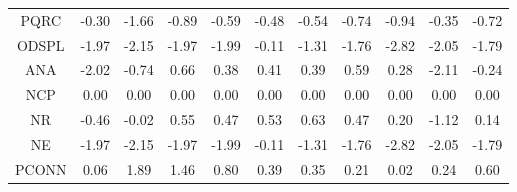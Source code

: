 \documentclass[11pt,a4paper]{report}
\begin{document}
\begin{longtable}{ | c || c | c | c | c | c | c | c | c | c || c |}
PQRC &  \cellcolor[HTML]{FFF7F7} -0.30 &  \cellcolor[HTML]{FFD7D7} -1.66 &  \cellcolor[HTML]{FFE7E7} -0.89 &  \cellcolor[HTML]{FFEFEF} -0.59 &  \cellcolor[HTML]{FFEFEF} -0.48 &  \cellcolor[HTML]{FFEFEF} -0.54 &  \cellcolor[HTML]{FFEFEF} -0.74 &  \cellcolor[HTML]{FFE7E7} -0.94 &  \cellcolor[HTML]{FFF7F7} -0.35 &  \cellcolor[HTML]{FFEFEF} -0.72 \\
ODSPL &  \cellcolor[HTML]{FFCFCF} -1.97 &  \cellcolor[HTML]{FFC7C7} -2.15 &  \cellcolor[HTML]{FFCFCF} -1.97 &  \cellcolor[HTML]{FFCFCF} -1.99 &  \cellcolor[HTML]{FFFFFF} -0.11 &  \cellcolor[HTML]{FFDFDF} -1.31 &  \cellcolor[HTML]{FFCFCF} -1.76 &  \cellcolor[HTML]{FFB7B7} -2.82 &  \cellcolor[HTML]{FFCFCF} -2.05 &  \cellcolor[HTML]{FFCFCF} -1.79 \\
ANA &  \cellcolor[HTML]{FFCFCF} -2.02 &  \cellcolor[HTML]{FFEFEF} -0.74 &  \cellcolor[HTML]{EFEFFF} 0.66 &  \cellcolor[HTML]{F7F7FF} 0.38 &  \cellcolor[HTML]{F7F7FF} 0.41 &  \cellcolor[HTML]{F7F7FF} 0.39 &  \cellcolor[HTML]{EFEFFF} 0.59 &  \cellcolor[HTML]{F7F7FF} 0.28 &  \cellcolor[HTML]{FFC7C7} -2.11 &  \cellcolor[HTML]{FFF7F7} -0.24 \\
NCP &  \cellcolor[HTML]{FFFFFF} 0.00 &  \cellcolor[HTML]{FFFFFF} 0.00 &  \cellcolor[HTML]{FFFFFF} 0.00 &  \cellcolor[HTML]{FFFFFF} 0.00 &  \cellcolor[HTML]{FFFFFF} 0.00 &  \cellcolor[HTML]{FFFFFF} 0.00 &  \cellcolor[HTML]{FFFFFF} 0.00 &  \cellcolor[HTML]{FFFFFF} 0.00 &  \cellcolor[HTML]{FFFFFF} 0.00 &  \cellcolor[HTML]{FFFFFF} 0.00 \\
NR &  \cellcolor[HTML]{FFF7F7} -0.46 &  \cellcolor[HTML]{FFFFFF} -0.02 &  \cellcolor[HTML]{EFEFFF} 0.55 &  \cellcolor[HTML]{F7F7FF} 0.47 &  \cellcolor[HTML]{EFEFFF} 0.53 &  \cellcolor[HTML]{EFEFFF} 0.63 &  \cellcolor[HTML]{F7F7FF} 0.47 &  \cellcolor[HTML]{F7F7FF} 0.20 &  \cellcolor[HTML]{FFDFDF} -1.12 &  \cellcolor[HTML]{FFFFFF} 0.14 \\
NE &  \cellcolor[HTML]{FFCFCF} -1.97 &  \cellcolor[HTML]{FFC7C7} -2.15 &  \cellcolor[HTML]{FFCFCF} -1.97 &  \cellcolor[HTML]{FFCFCF} -1.99 &  \cellcolor[HTML]{FFFFFF} -0.11 &  \cellcolor[HTML]{FFDFDF} -1.31 &  \cellcolor[HTML]{FFCFCF} -1.76 &  \cellcolor[HTML]{FFB7B7} -2.82 &  \cellcolor[HTML]{FFCFCF} -2.05 &  \cellcolor[HTML]{FFCFCF} -1.79 \\
PCONN &  \cellcolor[HTML]{FFFFFF} 0.06 &  \cellcolor[HTML]{CFCFFF} 1.89 &  \cellcolor[HTML]{D7D7FF} 1.46 &  \cellcolor[HTML]{E7E7FF} 0.80 &  \cellcolor[HTML]{F7F7FF} 0.39 &  \cellcolor[HTML]{F7F7FF} 0.35 &  \cellcolor[HTML]{F7F7FF} 0.21 &  \cellcolor[HTML]{FFFFFF} 0.02 &  \cellcolor[HTML]{F7F7FF} 0.24 &  \cellcolor[HTML]{EFEFFF} 0.60 \\

\end{longtable}
\end{document}
